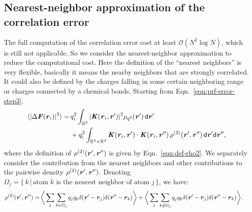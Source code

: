 \documentclass[aps,pre,preprint,unsortedaddress]{revtex4}
\renewcommand{\v}[1]{\textbf{\textit{#1}}}
\renewcommand{\d}[1]{\textsf{#1}}
\begin{document}
\subsection{Nearest-neighbor approximation of the correlation
error}
The full computation of the correlation error cost at least $\mathcal
O(N^2\log N)$, which is still not applicable.
So we consider the nearest-neighbor approximation to reduce
the computational cost.
Here the definition of the ``nearest neighbors'' is
very flexible, basically it means the nearby neighbors that are
strongly correlated. It could also be defined by the charges falling in some
certain neighboring range or charges connected by a chemical bonds.
Starting from Eqn.~\eqref{eqn:prf-error-step3},
\begin{align} \nonumber
  \langle\vert\Delta\v F(\v r_i)\vert^2\rangle
  =\,&
  q_i^2\int_{\mathbb R^3}
  \vert\v K(\v r_i , \v r')\vert^2\rho_{q^2}(\v r')\,\d d\v r'
  \\
  & +
  q_i^2\int_{\mathbb R^3\times\mathbb R^3}
  \v K(\v r_i , \v r')\cdot\v K(\v r_i , \v r'')\,
  \rho^{(2)}(\v r', \v r'')
  \,\d d\v r'\d d\v r'',
\end{align}
where the definition of $\rho^{(2)}(\v r', \v r'')$ is given by
Eqn.~\eqref{eqn:def-rho2}.
We separately consider the  contribution from the nearest neighbors
and other contributions to
the pairwise density $\rho^{(2)}(\v r', \v r'')$.  Denoting
$\Omega_j = \{ \,k\,\vert\,
\textrm{atom $k$ is the nearest neighbor of atom $j$} \,\}$,
we have:
\begin{align}\label{eqn:split-rho-q2}
  \rho^{(2)}(\v r', \v r'')
  = &\,
  \bigg\langle
  \sum_j\sum_{k\in\Omega_j}q_j q_k\delta(\v r' - \v r_j)\delta(\v r'' - \v r_k)
  \bigg\rangle
  +
  \bigg\langle
  \sum_j\sum_{k\notin\Omega_j}q_j q_k\delta(\v r' - \v r_j)\delta(\v r'' - \v r_k)
  \bigg\rangle.
\end{align}
\end{document}
